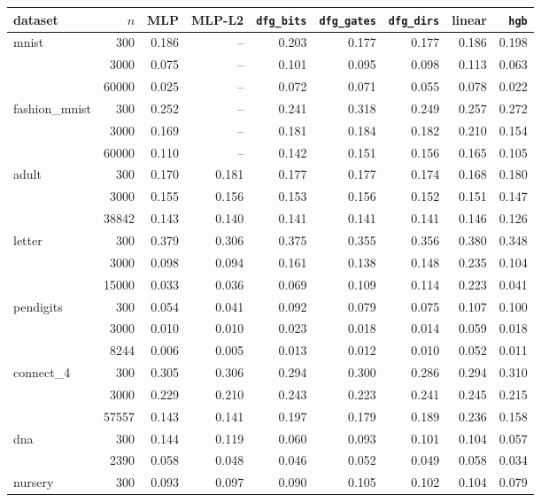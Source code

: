 \begin{tabular}{lrrrrrrrr}
\toprule
dataset & $n$ & MLP & MLP-L2 & \texttt{dfg\_bits} & \texttt{dfg\_gates} & \texttt{dfg\_dirs} & linear & \texttt{hgb}\\
\midrule
mnist & 300 & 0.186 & -- & 0.203 & 0.177 & 0.177 & 0.186 & 0.198\\
 & 3000 & 0.075 & -- & 0.101 & 0.095 & 0.098 & 0.113 & 0.063\\
 & 60000 & 0.025 & -- & 0.072 & 0.071 & 0.055 & 0.078 & 0.022\\
\addlinespace[1pt]
fashion\_mnist & 300 & 0.252 & -- & 0.241 & 0.318 & 0.249 & 0.257 & 0.272\\
 & 3000 & 0.169 & -- & 0.181 & 0.184 & 0.182 & 0.210 & 0.154\\
 & 60000 & 0.110 & -- & 0.142 & 0.151 & 0.156 & 0.165 & 0.105\\
\addlinespace[1pt]
adult & 300 & 0.170 & 0.181 & 0.177 & 0.177 & 0.174 & 0.168 & 0.180\\
 & 3000 & 0.155 & 0.156 & 0.153 & 0.156 & 0.152 & 0.151 & 0.147\\
 & 38842 & 0.143 & 0.140 & 0.141 & 0.141 & 0.141 & 0.146 & 0.126\\
\addlinespace[1pt]
letter & 300 & 0.379 & 0.306 & 0.375 & 0.355 & 0.356 & 0.380 & 0.348\\
 & 3000 & 0.098 & 0.094 & 0.161 & 0.138 & 0.148 & 0.235 & 0.104\\
 & 15000 & 0.033 & 0.036 & 0.069 & 0.109 & 0.114 & 0.223 & 0.041\\
\addlinespace[1pt]
pendigits & 300 & 0.054 & 0.041 & 0.092 & 0.079 & 0.075 & 0.107 & 0.100\\
 & 3000 & 0.010 & 0.010 & 0.023 & 0.018 & 0.014 & 0.059 & 0.018\\
 & 8244 & 0.006 & 0.005 & 0.013 & 0.012 & 0.010 & 0.052 & 0.011\\
\addlinespace[1pt]
connect\_4 & 300 & 0.305 & 0.306 & 0.294 & 0.300 & 0.286 & 0.294 & 0.310\\
 & 3000 & 0.229 & 0.210 & 0.243 & 0.223 & 0.241 & 0.245 & 0.215\\
 & 57557 & 0.143 & 0.141 & 0.197 & 0.179 & 0.189 & 0.236 & 0.158\\
\addlinespace[1pt]
dna & 300 & 0.144 & 0.119 & 0.060 & 0.093 & 0.101 & 0.104 & 0.057\\
 & 2390 & 0.058 & 0.048 & 0.046 & 0.052 & 0.049 & 0.058 & 0.034\\
\addlinespace[1pt]
nursery & 300 & 0.093 & 0.097 & 0.090 & 0.105 & 0.102 & 0.104 & 0.079\\

\end{tabular}

